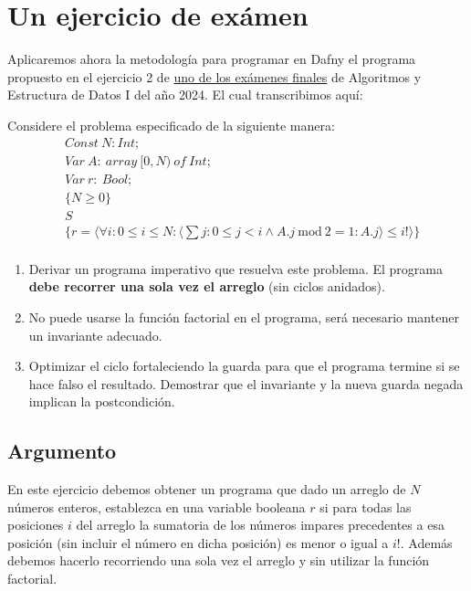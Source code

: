 \documentclass[12pt, a4paper, openany, fleqn]{book}
\begin{document}
    \section{Un ejercicio de exámen}
    Aplicaremos ahora la metodología para programar en Dafny el programa propuesto en el ejercicio 2 de \href{https://github.com/ExamenesViejos-FAMAF-Computacion/ExamenesViejos_AlgoritmosYEstructurasDeDatos1_FAMAF/blob/d2ef152c594b2847f8c95a0c423d333403aaa88b/Pr%C3%A1ctico/Final%202024-12-03.jpg}{uno de los exámenes finales} de Algoritmos y Estructura de Datos I del año 2024. El cual transcribimos aquí:

    Considere el problema especificado de la siguiente manera:
    \begin{align*}
        &Const\ N: Int;\\
        &Var\ A:\ array\ [0, N)\ of\ Int;\\
        &Var\ r:\ Bool;\\
        &\{N \geqslant 0\}\\
        &    S\\
        &\{r = \langle\forall i : 0 \leqslant i \leqslant N : \langle\sum j : 0 \leqslant j < i \land A.j\ \text{mod}\ 2 = 1 : A.j\rangle \leqslant i! \rangle \}\\
    \end{align*}

    \begin{enumerate}
        \item Derivar un programa imperativo que resuelva este problema. El programa \textbf{debe recorrer una sola vez el arreglo} (sin ciclos anidados).
        \item No puede usarse la función factorial en el programa, será necesario mantener un invariante adecuado.
        \item Optimizar el ciclo fortaleciendo la guarda para que el programa termine si se hace falso el resultado. Demostrar que el invariante y la nueva guarda negada implican la postcondición.
    \end{enumerate}

    \subsection*{Argumento}
    En este ejercicio debemos obtener un programa que dado un arreglo de $N$ números enteros, establezca en una variable booleana $r$ si para todas las posiciones $i$ del arreglo la sumatoria de los números impares precedentes a esa posición (sin incluir el número en dicha posición) es menor o igual a $i!$. Además debemos hacerlo recorriendo una sola vez el arreglo y sin utilizar la función factorial.
\end{document}
